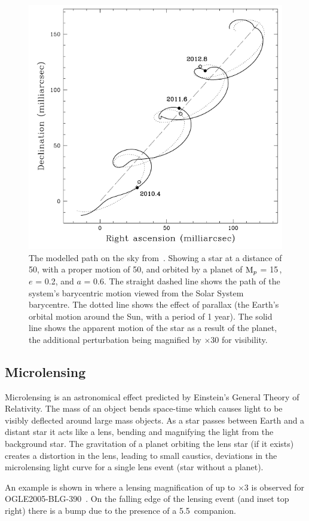 \begin{figure}
    \centering
    \includegraphics[width=0.5\linewidth]{./figures/introduction/Astrometry_Perryman2000.png}
    \caption{The modelled path on the sky from~\citet{perryman_extrasolar_2000}.
        Showing a star at a distance of 50\pc, with a proper motion of 50\masperyr{}, and orbited by a planet of $\textrm{M}_{p}$ = 15\,\Mjup{}, $e$ = 0.2, and $a$ = 0.6\AU{}.
        The straight dashed line shows the path of the system's barycentric motion viewed from the Solar System barycentre.
        The dotted line shows the effect of parallax (the Earth's orbital motion around the Sun, with a period of 1 year).
        The solid line shows the apparent motion of the star as a result of the planet, the additional perturbation being magnified by $\times 30$ for visibility.}
    \label{fig:astrometry_perryman}
\end{figure}


\subsection{Microlensing}
\label{sub:microlensing}
Microlensing is an astronomical effect predicted by Einstein's General Theory of Relativity.
The mass of an object bends space-time which causes light to be visibly deflected around large mass objects.
As a star passes between Earth and a distant star it acts like a lens, bending and magnifying the light from the background star.
The gravitation of a planet orbiting the lens star (if it exists) creates a distortion in the lens, leading to small caustics, deviations in the microlensing light curve for a single lens event (star without a planet).

An example is shown in  where a lensing magnification of up to $\times3$ is observed for {OGLE2005-BLG-390}~\citep{beaulieu_discovery_2006}.
On the falling edge of the lensing event (and inset top right) there is a bump due to the presence of a 5.5\,\Mjup{} companion.

